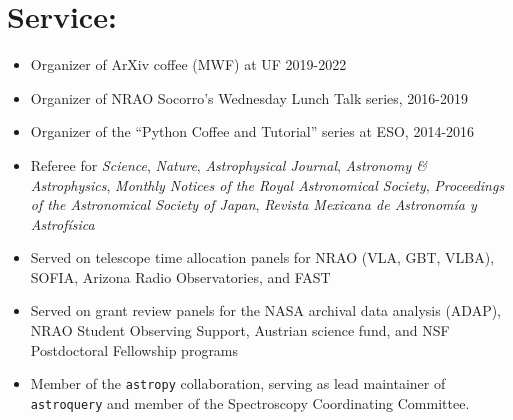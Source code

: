 
\begin{minipage}{\textwidth}
\setlength{\extrarowheight}{4pt}
\section*{Service:}
\vspace{-10pt}
\begin{itemize}
\itemsep-3pt
        
    \item Organizer of ArXiv coffee (MWF) at UF 2019-2022
    \item Organizer of NRAO Socorro's Wednesday Lunch Talk series, 2016-2019
    \item Organizer of the ``Python Coffee and Tutorial'' series at ESO, 2014-2016
    \item Referee for 
            \textit{Science},
            \textit{Nature},
            \textit{Astrophysical Journal},
            \textit{Astronomy \& Astrophysics},
            \textit{Monthly Notices of the Royal Astronomical Society},
            \textit{Proceedings of the Astronomical Society of Japan},
            \textit{Revista Mexicana de Astronom{\'i}a y Astrof{\'i}sica}
    \item Served on telescope time allocation panels for NRAO (VLA, GBT, VLBA), SOFIA,
        Arizona Radio Observatories, and FAST
    \item Served on grant review panels for the NASA archival data analysis (ADAP), 
        NRAO Student Observing Support,
        Austrian science fund,
        and NSF Postdoctoral Fellowship programs
    \item Member of the \texttt{astropy} collaboration, serving as lead maintainer
        of \texttt{astroquery} and member of the Spectroscopy Coordinating Committee.
\end{itemize}
\end{minipage}
\vspace{4mm}
